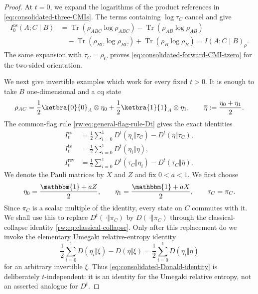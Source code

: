 \documentclass[11pt]{article}
\theoremstyle{remark}
\DeclareMathOperator{\os}{os}
\DeclareMathOperator{\ts}{ts}
\DeclareMathOperator{\rev}{rev}
\newcommand{\1}{\mathbbm{1}}
\begin{document}
\begin{proof}
At $t=0$, we expand the logarithms of the product references in
\eqref{eq:consolidated-three-CMIs}.  The terms containing
$\log\tau_C$ cancel and give
\begin{equation}
 \begin{aligned}
 I_0^{\os}(A;C\mid B)
 &=\operatorname{Tr}(\rho_{ABC}\log\rho_{ABC})
   -\operatorname{Tr}(\rho_{AB}\log\rho_{AB})\\
 &\quad-\operatorname{Tr}(\rho_{BC}\log\rho_{BC})
   +\operatorname{Tr}(\rho_B\log\rho_B)
 =I(A;C\mid B)_\rho.
 \end{aligned}
\end{equation}
The same expansion with $\tau_C=\rho_C$ proves
\eqref{eq:consolidated-forward-CMI-tzero} for the two-sided
orientation.

We next give invertible examples which work for every fixed $t>0$.
It is enough to take $B$ one-dimensional and a cq state
\begin{equation}
 \rho_{AC}=\frac12\ketbra{0}{0}_A\otimes\eta_0
             +\frac12\ketbra{1}{1}_A\otimes\eta_1,
 \qquad
 \overline\eta:=\frac{\eta_0+\eta_1}{2}.
 \label{eq:consolidated-cq-ordering-state}
\end{equation}
The common-flag rule
\eqref{rw:eq:general-flag-rule-Dt} gives the exact identities
\begin{equation}
 \begin{aligned}
 I_t^{\os}
 &=\frac12\sum_{i=0}^1D^t(\eta_i\Vert\tau_C)
   -D^t(\overline\eta\Vert\tau_C),\\
 I_t^{\ts}
 &=\frac12\sum_{i=0}^1D^t(\eta_i\Vert\overline\eta),\\
 I_t^{\rev}
 &=\frac12\sum_{i=0}^1D^t(\tau_C\Vert\eta_i)
   -D^t(\tau_C\Vert\overline\eta).
 \end{aligned}
 \label{eq:consolidated-cq-three-CMIs}
\end{equation}
We denote the Pauli matrices by $X$ and $Z$ and fix $0<a<1$.
We first choose
\begin{equation}
 \eta_0=\frac{\1+aZ}{2},
 \qquad
 \eta_1=\frac{\1+aX}{2},
 \qquad
 \tau_C=\pi_C.
\end{equation}
Since $\pi_C$ is a scalar multiple of the identity, every state on
$C$ commutes with it.  We shall use this to replace
$D^t(\,\cdot\Vert\pi_C)$ by $D(\,\cdot\Vert\pi_C)$ through the
classical-collapse identity \eqref{rw:eq:classical-collapse}.  Only
after this replacement do we invoke the elementary Umegaki
relative-entropy identity
\cite{donald1986relative}
\begin{equation}
 \frac12\sum_{i=0}^1D(\eta_i\Vert\xi)
 -D(\overline\eta\Vert\xi)
 =\frac12\sum_{i=0}^1D(\eta_i\Vert\overline\eta)
 \label{eq:consolidated-Donald-identity}
\end{equation}
for an arbitrary invertible $\xi$.  Thus \eqref{eq:consolidated-Donald-identity}
is deliberately $t$-independent: it is an identity for the Umegaki
relative entropy, not an asserted analogue for $D^t$.


\end{proof}
\end{document}
